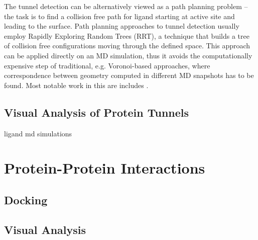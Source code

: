 The tunnel detection can be alternatively viewed as a path planning problem -- the task is to find a collision free path for ligand starting at active site and leading to the surface. Path planning approaches to tunnel detection usually employ Rapidly Exploring Random Trees \cite{lavalle1998rapidly} (RRT), a technique that builds a tree of collision free configurations moving through the defined space. This approach can be applied directly on an MD simulation, thus it avoids the computationally expensive step of traditional, e.g. Voronoi-based approaches, where correspondence between geometry computed in different MD snapshots has to be found. Most notable work in this are includes \cite{cortes2005path, vonasek2016application, vonasek2017tunnel}.

\subsection{Visual Analysis of Protein Tunnels}


ligand md simulations

\section{Protein-Protein Interactions}

\subsection{Docking}
\subsection{Visual Analysis}
